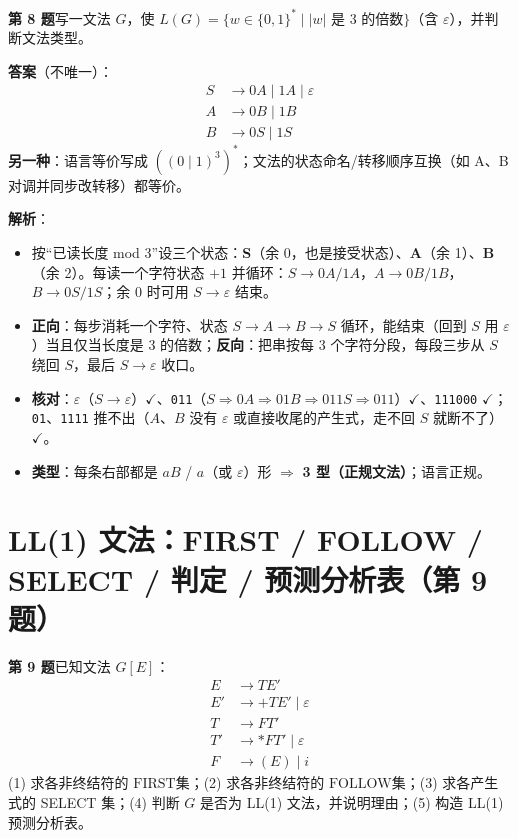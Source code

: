 \documentclass[12pt,a4paper,fontset=windows]{ctexart}
\newcommand{\FRname}{\ensuremath{\mathrm{FIRST}}}
\newcommand{\FOname}{\ensuremath{\mathrm{FOLLOW}}}
\newcommand{\ok}{\ensuremath{\checkmark}}
\newcommand{\imp}{\ensuremath{\Rightarrow}}
\begin{document}
\begin{qbox}
{\large\bfseries 第 8 题}\quad 写一文法 $G$，使 $L(G)=\{w \in \{0,1\}^* \mid |w| \text{ 是 3 的倍数}\}$（含 $\varepsilon$），并判断文法类型。
\end{qbox}

\textbf{答案}（不唯一）：
\[
\begin{aligned}
S &\to 0A \mid 1A \mid \varepsilon\\
A &\to 0B \mid 1B\\
B &\to 0S \mid 1S
\end{aligned}
\]
\textbf{另一种}：语言等价写成 $((0 \mid 1)^3)^*$；文法的状态命名/转移顺序互换（如 A、B 对调并同步改转移）都等价。

\textbf{解析}：
\begin{itemize}
\item 按``已读长度 mod 3''设三个状态：\textbf{S}（余 0，也是接受状态）、\textbf{A}（余 1）、\textbf{B}（余 2）。每读一个字符状态 $+1$ 并循环：$S \to 0A/1A$，$A \to 0B/1B$，$B \to 0S/1S$；余 0 时可用 $S \to \varepsilon$ 结束。
\item \textbf{正向}：每步消耗一个字符、状态 $S \to A \to B \to S$ 循环，能结束（回到 $S$ 用 $\varepsilon$）当且仅当长度是 3 的倍数；\textbf{反向}：把串按每 3 个字符分段，每段三步从 $S$ 绕回 $S$，最后 $S \to \varepsilon$ 收口。
\item \textbf{核对}：$\varepsilon$（$S \to \varepsilon$）\ok、\texttt{011}（$S \Rightarrow 0A \Rightarrow 01B \Rightarrow 011S \Rightarrow 011$）\ok、\texttt{111000} \ok；\texttt{01}、\texttt{1111} 推不出（$A$、$B$ 没有 $\varepsilon$ 或直接收尾的产生式，走不回 $S$ 就断不了）\ok。
\item \textbf{类型}：每条右部都是 $aB$ / $a$（或 $\varepsilon$）形 \imp{} \textbf{3 型（正规文法）}；语言正规。
\end{itemize}

\section{LL(1) 文法：FIRST / FOLLOW / SELECT / 判定 / 预测分析表（第 9 题）}

\begin{qbox}
{\large\bfseries 第 9 题}\quad 已知文法 $G[E]$：
\[ \begin{aligned}
E  &\to T E'\\
E' &\to + T E' \mid \varepsilon\\
T  &\to F T'\\
T' &\to * F T' \mid \varepsilon\\
F  &\to ( E ) \mid i
\end{aligned} \]
(1) 求各非终结符的 \FRname 集；(2) 求各非终结符的 \FOname 集；(3) 求各产生式的 SELECT 集；(4) 判断 $G$ 是否为 LL(1) 文法，并说明理由；(5) 构造 LL(1) 预测分析表。
\end{qbox}
\end{document}
